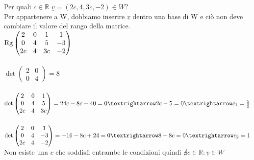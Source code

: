 \begin{esercizio}
  Per quali $c\in\mathbb{R}$ $\underline{v}=(2c,4,3c,-2)\in W?$
  \leavevmode\\
  Per appartenere a W, dobbiamo inserire $\underline{v}$ dentro una
  base di W e ciò non deve cambiare il valore del rango della matrice.
  \leavevmode\\
  $
  \textnormal{Rg}
  \begin{pmatrix}
    2 & 0 & 1 & 1\\
    0 & 4 & 5 & -3\\
    2c & 4 & 3c & -2
  \end{pmatrix}
  $
  \leavevmode\\\\
  $
  \det
  \begin{pmatrix}
    2 & 0\\
    0 & 4
  \end{pmatrix}=8
  $
  \leavevmode\\\\
  $
  \det
  \begin{pmatrix}
    2 & 0 & 1\\
    0 & 4 & 5\\
    2c & 4 & 3c
  \end{pmatrix}=24c-8c-40=0\textrightarrow2c-5=0\textrightarrow c_1=\frac{5}{2}
  $
  \leavevmode\\\\
  $
  \det
  \begin{pmatrix}
    2 & 0 & 1\\
    0 & 4 & -3\\
    2c & 4 & -2
  \end{pmatrix}=-16-8c+24=0\textrightarrow8-8c=0\textrightarrow c_2=1
  $
  \leavevmode\\
  Non esiste una $c$ che soddisfi entrambe le condizioni quindi
  $\nexists c\in \mathbb{R}:\underline{v}\in W$
\end{esercizio}

